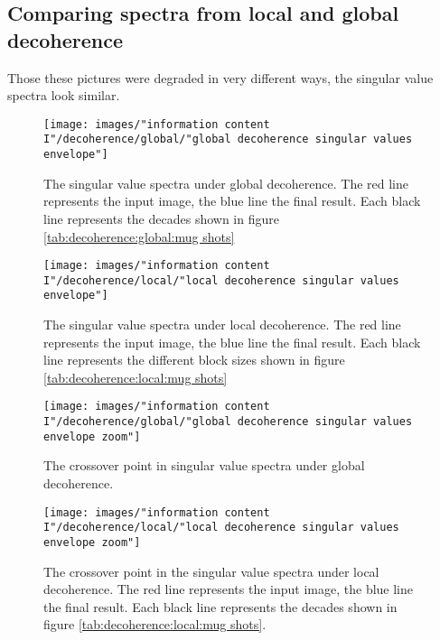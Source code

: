 \subsection{Comparing spectra from local and global decoherence}
Those these pictures were degraded in very different ways, the singular value spectra look similar.
%
\begin{figure}[htbp] %
   \centering
   \texttt{[image: images/"information content I"/decoherence/global/"global decoherence singular values envelope"]} 
   \caption[The singular value spectra under global decoherence]{The singular value spectra under global decoherence. The red line represents the input image, the blue line the final result. Each black line represents the decades shown in figure \eqref{tab:decoherence:global:mug shots}}
   \label{fig:decoherence:global:spectra}
\end{figure}
%
\begin{figure}[htbp] %
   \centering
   \texttt{[image: images/"information content I"/decoherence/local/"local decoherence singular values envelope"]} 
   \caption[The singular value spectra under local decoherence]{The singular value spectra under local decoherence. The red line represents the input image, the blue line the final result. Each black line represents the different block sizes shown in figure \eqref{tab:decoherence:local:mug shots}}
   \label{fig:decoherence:local:spectra}
\end{figure}
\clearpage
\begin{figure}[htbp] %
   \centering
   \texttt{[image: images/"information content I"/decoherence/global/"global decoherence singular values envelope zoom"]} 
   \caption[The crossover point in singular value spectra under global decoherence]{The crossover point in singular value spectra under global decoherence.}
   \label{fig:decoherence:global:spectra:zoom}
\end{figure}
\begin{figure}[htbp] %
   \centering
   \texttt{[image: images/"information content I"/decoherence/local/"local decoherence singular values envelope zoom"]} 
   \caption[The crossover point in the singular value spectra under local decoherence]{The crossover point in the singular value spectra under local decoherence. The red line represents the input image, the blue line the final result. Each black line represents the decades shown in figure \eqref{tab:decoherence:local:mug shots}.}
   \label{fig:decoherence:local:spectra:zoom}
\end{figure}


\endinput